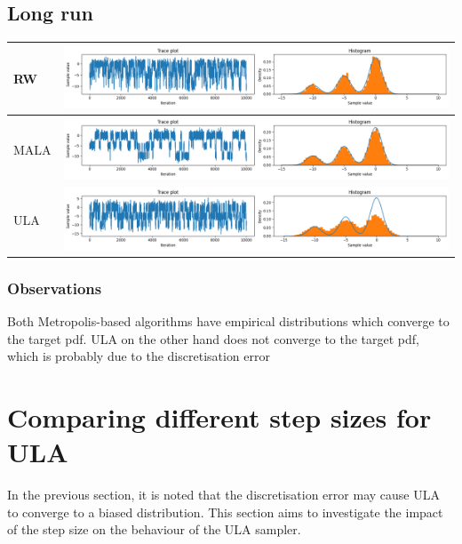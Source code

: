 \documentclass{article}
\theoremstyle{definition}
\newcommand{\1}{\mathbbm{1}}
\begin{document}
{\renewcommand{\arraystretch}{5}%
\subsection{Long run}
\begin{tabular}{|l|l|}
	\hline
	RW & \includegraphics[width=0.8\linewidth,valign=m]{diagnostics/rwlong.png} \\
	\hline
	MALA & \includegraphics[width=0.8\linewidth,valign=m]{diagnostics/malalong.png} \\
	\hline
	ULA & \includegraphics[width=0.8\linewidth,valign=m]{diagnostics/ulalong.png}\\
	\hline
\end{tabular}
}


\subsubsection{Observations}
Both Metropolis-based algorithms have empirical distributions which converge to the target pdf. ULA on the other hand does not converge to the target pdf, which is probably due to the discretisation error





\newpage
\section{Comparing different step sizes for ULA}
In the previous section, it is noted that the discretisation error may cause ULA to converge to a biased distribution. This section aims to investigate the impact of the step size on the behaviour of the ULA sampler.
\end{document}

